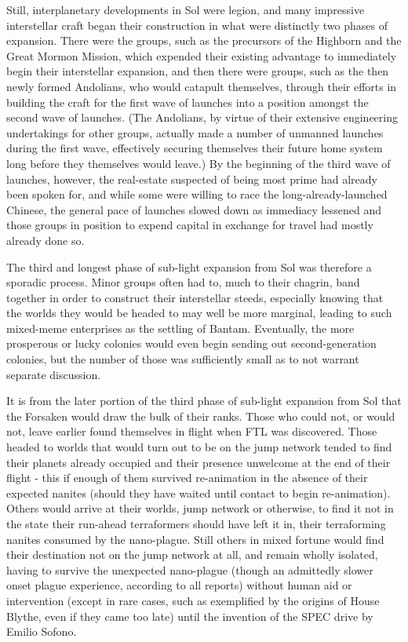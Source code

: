 Still, interplanetary developments in Sol were legion, and many
impressive interstellar craft began their construction in what were
distinctly two phases of expansion. There were the groups, such as the
precursors of the Highborn and the Great Mormon Mission, which
expended their existing advantage to immediately begin their
interstellar expansion, and then there were groups, such as the then
newly formed Andolians, who would catapult themselves, through their
efforts in building the craft for the first wave of launches into a
position amongst the second wave of launches. (The Andolians, by
virtue of their extensive engineering undertakings for other groups,
actually made a number of unmanned launches during the first wave,
effectively securing themselves their future home system long before
they themselves would leave.) By the beginning of the third wave of
launches, however, the real-estate suspected of being most prime had
already been spoken for, and while some were willing to race the
long-already-launched Chinese, the general pace of launches slowed
down as immediacy lessened and those groups in position to expend
capital in exchange for travel had mostly already done so.

The third and longest phase of sub-light expansion from Sol was
therefore a sporadic process. Minor groups often had to, much to their
chagrin, band together in order to construct their interstellar
steeds, especially knowing that the worlds they would be headed to may
well be more marginal, leading to such mixed-meme enterprises as the
settling of Bantam. Eventually, the more prosperous or lucky colonies
would even begin sending out second-generation colonies, but the
number of those was sufficiently small as to not warrant separate
discussion.

It is from the later portion of the third phase of sub-light expansion
from Sol that the Forsaken would draw the bulk of their ranks. Those
who could not, or would not, leave earlier found themselves in flight
when FTL was discovered. Those headed to worlds that would turn out to
be on the jump network tended to find their planets already occupied
and their presence unwelcome at the end of their flight - this if
enough of them survived re-animation in the absence of their expected
nanites (should they have waited until contact to begin
re-animation). Others would arrive at their worlds, jump network or
otherwise, to find it not in the state their run-ahead terraformers
should have left it in, their terraforming nanites consumed by the
nano-plague. Still others in mixed fortune would find their destination
not on the jump network at all, and remain wholly isolated, having to
survive the unexpected nano-plague (though an admittedly slower onset
plague experience, according to all reports) without human aid or
intervention (except in rare cases, such as exemplified by the origins
of House Blythe, even if they came too late) until the invention of
the SPEC drive by Emilio Sofono.

